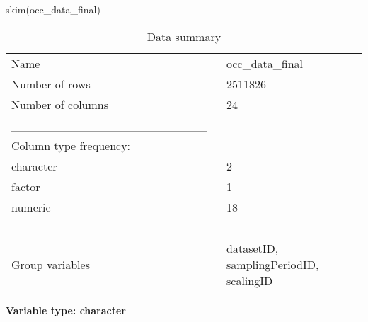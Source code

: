 \documentclass[
  letterpaper,
  DIV=11,
  numbers=noendperiod]{scrreprt}
\newenvironment{Shaded}{\begin{snugshade}}{\end{snugshade}}
\newcommand{\FunctionTok}[1]{\textcolor[rgb]{0.28,0.35,0.67}{#1}}
\newcommand{\NormalTok}[1]{\textcolor[rgb]{0.00,0.23,0.31}{#1}}
\begin{document}
\begin{Shaded}
\begin{Highlighting}[]
\FunctionTok{skim}\NormalTok{(occ\_data\_final)}
\end{Highlighting}
\end{Shaded}

\begin{longtable}[]{@{}ll@{}}
\caption{Data summary}\tabularnewline
\toprule\noalign{}
\endfirsthead
\endhead
\bottomrule\noalign{}
\endlastfoot
Name & occ\_data\_final \\
Number of rows & 2511826 \\
Number of columns & 24 \\
\_\_\_\_\_\_\_\_\_\_\_\_\_\_\_\_\_\_\_\_\_\_\_ & \\
Column type frequency: & \\
character & 2 \\
factor & 1 \\
numeric & 18 \\
\_\_\_\_\_\_\_\_\_\_\_\_\_\_\_\_\_\_\_\_\_\_\_\_ & \\
Group variables & datasetID, samplingPeriodID, scalingID \\
\end{longtable}

\textbf{Variable type: character}
\end{document}
